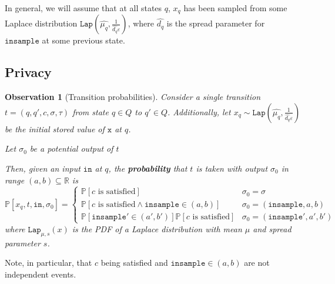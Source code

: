 \documentclass[12pt]{article}
\newcommand{\RR}{\mathbb{R}}
\newcommand{\PP}{\mathbb{P}}
\newcommand{\Lap}{\texttt{Lap}}
\newtheorem{obs}[thm]{Observation}
\theoremstyle{definition}
\begin{document}
In general, we will assume that at all states $q$, $x_q$ has been sampled from some Laplace distribution $\Lap(\hat{\mu_q}, \frac{1}{\hat{d_{q}}\varepsilon})$, where $\hat{d_{q}}$ is the spread parameter for $\texttt{insample}$ at some previous state. 

\subsection{Privacy}

\begin{obs}[Transition probabilities]
    Consider a single transition $t=(q, q', c, \sigma, \tau)$ from state $q\in Q$ to $q'\in Q$. Additionally, let $x_q\sim \Lap(\hat{\mu_q}, \frac{1}{\hat{d_q}\varepsilon})$ be the initial stored value of $\texttt{x}$ at $q$. 

    Let $\sigma_0$ be a \textit{potential} output of $t$
    
    Then, given an input $\texttt{in}$ at $q$, the \textbf{probability} that $t$ is taken with output $\sigma_0$ in range $(a, b)\subseteq \RR$ is \[
        \PP[x_q, t, \texttt{in}, \sigma_0] = \begin{cases}
            \PP[c\text{ is satisfied}] & \sigma_0 =\sigma \\
            \PP[c\text{ is satisfied}\land \texttt{insample}\in(a, b)] & \sigma_0 = (\texttt{insample}, a, b)\\
            \PP[\texttt{insample}'\in (a', b')]\PP[c\text{ is satisfied}]& \sigma_0 = (\texttt{insample}', a', b')
        \end{cases}
    \]
    where $\Lap_{\mu, s}(x)$ is the PDF of a Laplace distribution with mean $\mu$ and spread parameter $s$.
\end{obs}

Note, in particular, that $c$ being satisfied and $\texttt{insample}\in (a, b)$ are not independent events.

\end{document}
